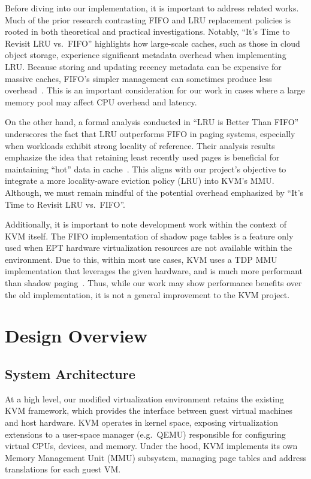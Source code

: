 \documentclass[letterpaper,twocolumn,10pt]{article}
\begin{document}
Before diving into our implementation, it is important to address related works.
Much of the prior research contrasting FIFO and LRU replacement policies is rooted
in both theoretical and practical investigations. Notably, ``It's Time to Revisit
LRU vs.\ FIFO'' highlights how large-scale caches, such as those in cloud object
storage, experience significant metadata overhead when implementing LRU. Because
storing and updating recency metadata can be expensive for massive caches, FIFO's
simpler management can sometimes produce less overhead~\cite{eytan2020}. This is an
important consideration for our work in cases where a large memory pool may affect
CPU overhead and latency.

On the other hand, a formal analysis conducted in ``LRU is Better Than FIFO''
underscores the fact that LRU outperforms FIFO in paging systems, especially when
workloads exhibit strong locality of reference. Their analysis results emphasize
the idea that retaining least recently used pages is beneficial for maintaining
``hot'' data in cache~\cite{chrobak1999, sleator1985}. This aligns with our project's objective
to integrate a more locality-aware eviction policy (LRU) into KVM's MMU. Although,
we must remain mindful of the potential overhead emphasized by ``It's Time to
Revisit LRU vs.\ FIFO''.

Additionally, it is important to note development work within the context of KVM
itself. The FIFO implementation of shadow page tables is a feature only used when
EPT hardware virtualization resources are not available within the environment.
Due to this, within most use cases, KVM uses a TDP MMU implementation that
leverages the given hardware, and is much more performant than shadow paging~\cite{bhargava2008}.
Thus, while our work may show performance benefits over the old implementation, it
is not a general improvement to the KVM project.

\section{Design Overview}

\subsection{System Architecture}

At a high level, our modified virtualization environment retains the existing KVM
framework, which provides the interface between guest virtual machines and host
hardware. KVM operates in kernel space, exposing virtualization extensions to a
user-space manager (e.g.\ QEMU) responsible for configuring virtual CPUs, devices,
and memory. Under the hood, KVM implements its own Memory Management Unit (MMU)
subsystem, managing page tables and address translations for each guest VM.
\end{document}
